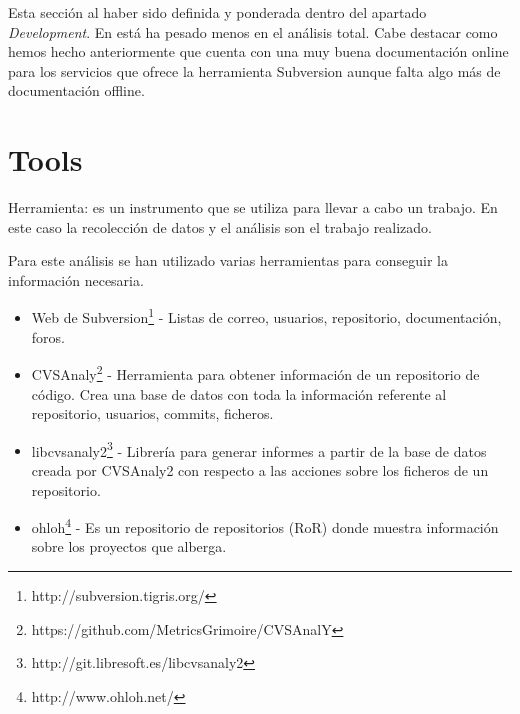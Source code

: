 \documentclass[11pt]{scrartcl}
\begin{document}
\par Esta secci\'on al haber sido definida y ponderada dentro del apartado \emph{Development}. En est\'a ha pesado menos en el an\'alisis total. Cabe destacar como hemos hecho anteriormente que cuenta con una muy buena documentaci\'on online para los servicios que ofrece la herramienta Subversion aunque falta algo m\'as de documentaci\'on offline.

\section{Tools}

\par Herramienta: es un instrumento que se utiliza para llevar a cabo un trabajo. En este caso la recolecci\'on de datos y el an\'alisis son el trabajo realizado.

\par Para este an\'alisis se han utilizado varias herramientas para conseguir la informaci\'on necesaria.

\begin{itemize}
    \item Web de Subversion\footnote{http://subversion.tigris.org/} - Listas de correo, usuarios, repositorio, documentaci\'on, foros.
    \item CVSAnaly\footnote{https://github.com/MetricsGrimoire/CVSAnalY} - Herramienta para obtener informaci\'on de un repositorio de c\'odigo. Crea una base de datos con toda la informaci\'on referente al repositorio, usuarios, commits, ficheros.
    \item libcvsanaly2\footnote{http://git.libresoft.es/libcvsanaly2} - Librer\'ia para generar informes a partir de la base de datos creada por CVSAnaly2 con respecto a las acciones sobre los ficheros de un repositorio.
    \item ohloh\footnote{http://www.ohloh.net/} - Es un repositorio de repositorios (RoR) donde muestra informaci\'on sobre los proyectos que alberga.

\end{itemize}
\end{document}
